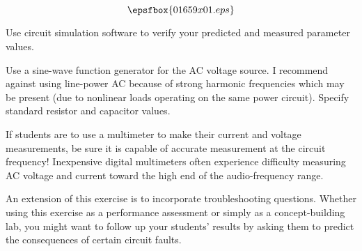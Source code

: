 

$$\epsfbox{01659x01.eps}$$

\vfil \eject






Use circuit simulation software to verify your predicted and measured parameter values.







Use a sine-wave function generator for the AC voltage source.  I recommend against using line-power AC because of strong harmonic frequencies which may be present (due to nonlinear loads operating on the same power circuit).  Specify standard resistor and capacitor values.

If students are to use a multimeter to make their current and voltage measurements, be sure it is capable of accurate measurement at the circuit frequency!  Inexpensive digital multimeters often experience difficulty measuring AC voltage and current toward the high end of the audio-frequency range.

An extension of this exercise is to incorporate troubleshooting questions.  Whether using this exercise as a performance assessment or simply as a concept-building lab, you might want to follow up your students' results by asking them to predict the consequences of certain circuit faults.




